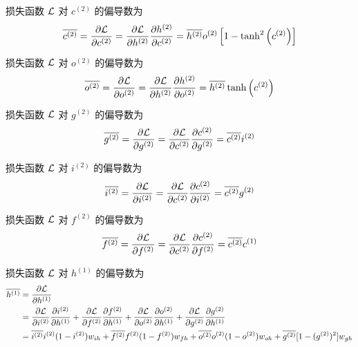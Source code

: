 \documentclass{article}
\begin{document}
损失函数 $\mathcal{L}$ 对 $c^{(2)}$ 的偏导数为
\begin{equation}
    \overline{c^{(2)}}
    =\frac{\partial\mathcal{L}}{\partial c^{(2)}}
    =\frac{\partial\mathcal{L}}{\partial h^{(2)}}\frac{\partial h^{(2)}}{\partial c^{(2)}}
    =\overline{h^{(2)}}o^{(2)}\left[1-\tanh^2\left(c^{(2)}\right)\right]
\end{equation}

损失函数 $\mathcal{L}$ 对 $o^{(2)}$ 的偏导数为
\begin{equation}
    \overline{o^{(2)}}
    =\frac{\partial\mathcal{L}}{\partial o^{(2)}}
    =\frac{\partial\mathcal{L}}{\partial h^{(2)}}\frac{\partial h^{(2)}}{\partial o^{(2)}}
    =\overline{h^{(2)}}\tanh\left(c^{(2)}\right)
\end{equation}

损失函数 $\mathcal{L}$ 对 $g^{(2)}$ 的偏导数为
\begin{equation}
    \overline{g^{(2)}}
    =\frac{\partial\mathcal{L}}{\partial g^{(2)}}
    =\frac{\partial\mathcal{L}}{\partial c^{(2)}}\frac{\partial c^{(2)}}{\partial g^{(2)}}
    =\overline{c^{(2)}}i^{(2)}
\end{equation}

损失函数 $\mathcal{L}$ 对 $i^{(2)}$ 的偏导数为
\begin{equation}
    \overline{i^{(2)}}
    =\frac{\partial\mathcal{L}}{\partial i^{(2)}}
    =\frac{\partial\mathcal{L}}{\partial c^{(2)}}\frac{\partial c^{(2)}}{\partial i^{(2)}}
    =\overline{c^{(2)}}g^{(2)}
\end{equation}

损失函数 $\mathcal{L}$ 对 $f^{(2)}$ 的偏导数为
\begin{equation}
    \overline{f^{(2)}}
    =\frac{\partial\mathcal{L}}{\partial f^{(2)}}
    =\frac{\partial\mathcal{L}}{\partial c^{(2)}}\frac{\partial c^{(2)}}{\partial f^{(2)}}
    =\overline{c^{(2)}}c^{(1)}
\end{equation}

损失函数 $\mathcal{L}$ 对 $h^{(1)}$ 的偏导数为
\begin{equation}
  \begin{aligned}
    \overline{h^{(1)}}
    &=\frac{\partial\mathcal{L}}{\partial h^{(1)}}\\
    &=\frac{\partial\mathcal{L}}{\partial i^{(2)}}\frac{\partial i^{(2)}}{\partial h^{(1)}}
      +\frac{\partial\mathcal{L}}{\partial f^{(2)}}\frac{\partial f^{(2)}}{\partial h^{(1)}}
      +\frac{\partial\mathcal{L}}{\partial o^{(2)}}\frac{\partial o^{(2)}}{\partial h^{(1)}}
      +\frac{\partial\mathcal{L}}{\partial g^{(2)}}\frac{\partial g^{(2)}}{\partial h^{(1)}}\\
    &=\overline{i^{(2)}}i^{(2)}(1-i^{(2)})w_{ih}+\overline{f^{(2)}}f^{(2)}(1-f^{(2)})w_{fh}+\overline{o^{(2)}}o^{(2)}(1-o^{(2)})w_{oh}+\overline{g^{(2)}}[1-(g^{(2)})^2]w_{gh}\\
  \end{aligned}
\end{equation}
\end{document}
